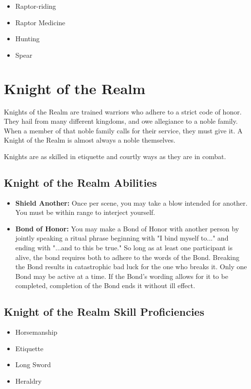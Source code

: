 \begin{multicols}{2}
\begin{itemize}
  \item Raptor-riding
  \item Raptor Medicine
  \item Hunting
  \item Spear
\end{itemize}

\section{Knight of the Realm}

Knights of the Realm are trained warriors who adhere to a strict code of
honor. They hail from many different kingdoms, and owe allegiance to a
noble family. When a member of that noble family calls for their service,
they must give it. A Knight of the Realm is almost always a noble themselves.

Knights are as skilled in etiquette and courtly ways as they are in combat.

\subsection{Knight of the Realm Abilities}

\begin{itemize}
  \item \textbf{Shield Another:} Once per scene, you may take a blow
    intended for another. You must be within range to interject yourself.
  \item \textbf{Bond of Honor:} You may make a Bond of Honor with another
    person by jointly speaking a ritual phrase beginning with "I bind myself
    to..." and ending with "...and to this be true." So long as at least one
    participant is alive, the bond requires both to adhere to the words of
    the Bond. Breaking the Bond results in catastrophic bad luck for the
    one who breaks it. Only one Bond may be active at a time. If the Bond's
    wording allows for it to be completed, completion of the Bond ends it
    without ill effect.
\end{itemize}

\subsection{Knight of the Realm Skill Proficiencies}

\begin{itemize}
  \item Horsemanship
  \item Etiquette
  \item Long Sword
  \item Heraldry
\end{itemize}


\end{multicols}
